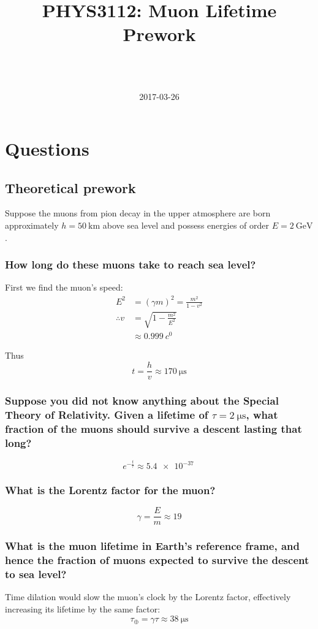 \documentclass[a4paper]{scrartcl}
\begin{document}
\title{PHYS3112: Muon Lifetime Prework}
\author{ \\ \\ }
\date{2017-03-26}
\maketitle

\section{Questions}
\subsection{Theoretical prework}
Suppose the muons from pion decay in the upper atmosphere are born approximately \(h = \SI{50}{\kilo\metre}\) above sea level and possess energies of order \(E = \SI{2}{\giga\electronvolt}\).

\subsubsection{How long do these muons take to reach sea level?}
First we find the muon's speed:
\begin{align*}
    E^2 &= (\gamma m)^2 = \frac{m^2}{1 - v^2} \\
    \therefore v &= \sqrt{1 - \frac{m^2}{E^2}} \\
    &\approx \SI{0.999}{\clight}
\end{align*}

Thus
\[t = \frac{h}{v} \approx \SI{170}{\micro\second}\]

\subsubsection{Suppose you did not know anything about the Special Theory of Relativity. Given a lifetime of \(\tau = \SI{2}{\micro\second}\), what fraction of the muons should survive a descent lasting that long?}
\[e^{-\frac{t}{\tau}} \approx \SI{5.4e-37}{}\]

\subsubsection{What is the Lorentz factor for the muon?}
\[\gamma = \frac{E}{m} \approx 19\]

\subsubsection{What is the muon lifetime in Earth's reference frame, and hence the fraction of muons expected to survive the descent to sea level?}
Time dilation would slow the muon's clock by the Lorentz factor, effectively increasing its lifetime by the same factor:
\[\tau_\oplus = \gamma \tau \approx \SI{38}{\micro\second}\]
\end{document}
